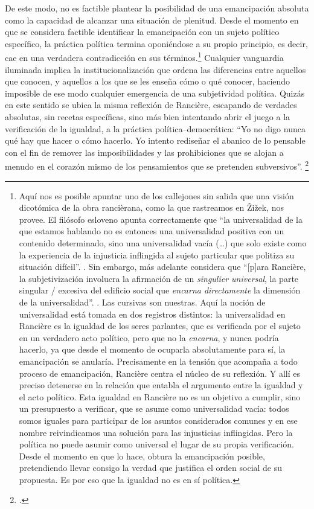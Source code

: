 De este modo, no es factible plantear la posibilidad de una emancipación absoluta como la capacidad de alcanzar una situación de plenitud. Desde el momento en que se considera factible identificar la emancipación con un sujeto político específico, la práctica política termina oponiéndose a su propio principio, es decir, cae en una verdadera contradicción en sus términos.\footnote{Aquí nos es posible apuntar uno de los callejones sin salida que una visión dicotómica de la obra rancièrana, como la que rastreamos en Žižek, nos provee. El filósofo esloveno apunta correctamente que \enquote{la universalidad de la que estamos hablando no es entonces una universalidad positiva con un contenido determinado, sino una universalidad vacía (\ldots)  que solo existe como la experiencia de la injusticia inflingida al sujeto particular que politiza su situación difícil}. \cite[][245]{@7063-ZIZEK2005}. Sin embargo, más adelante considera que \enquote{{[}p{]}ara Rancière, la subjetivización involucra la afirmación de un \emph{singulier universal}, la parte singular / excesiva del edificio social que \emph{encarna directamente} la dimensión de la universalidad}. \cite[Ver][249]{@7063-ZIZEK2005}. Las cursivas son nuestras. Aquí la noción de universalidad está tomada en dos registros distintos: la universalidad en Rancière es la igualdad de los seres parlantes, que es verificada por el sujeto en un verdadero acto político, pero que no la \emph{encarna}, y nunca podría hacerlo, ya que desde el momento de ocuparla absolutamente para sí, la emancipación se anularía. Precisamente en la tensión que acompaña a todo proceso de emancipación, Rancière centra el núcleo de su reflexión. Y allí es preciso detenerse en la relación que entabla el argumento entre la igualdad y el acto político. Esta igualdad en Rancière no es un objetivo a cumplir, sino un presupuesto a verificar, que se asume como universalidad vacía: todos somos iguales para participar de los asuntos considerados comunes y en ese nombre reivindicamos una solución para las injusticias inflingidas. Pero la política no puede asumir como universal el lugar de su propia verificación. Desde el momento en que lo hace, obtura la emancipación posible, pretendiendo llevar consigo la verdad que justifica el orden social de su propuesta. Es por eso que la igualdad no es en sí política.} Cualquier vanguardia iluminada implica la institucionalización que ordena las diferencias entre aquellos que conocen, y aquellos a los que se les enseña cómo o qué conocer, haciendo imposible de ese modo cualquier emergencia de una subjetividad política. Quizás en este sentido se ubica la misma reflexión de Rancière, escapando de verdades absolutas, sin recetas específicas, sino más bien intentando abrir el juego a la verificación de la igualdad, a la práctica política--democrática: \enquote{Yo no digo nunca qué hay que hacer o cómo hacerlo. Yo intento rediseñar el abanico de lo pensable con el fin de remover las imposibilidades y las prohibiciones que se alojan a menudo en el corazón mismo de los pensamientos que se pretenden subversivos}. \footcite[]{@7087-RANCIERE2007}

